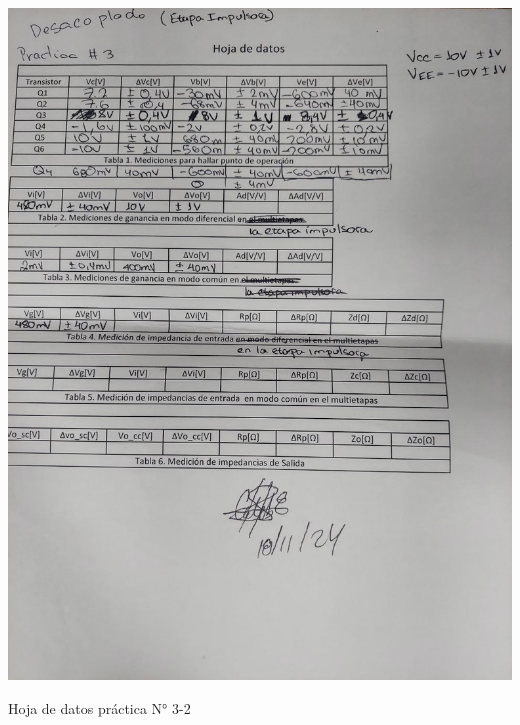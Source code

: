 \begin{ilustracion}[ht]
    \centering
    \includegraphics[width=1.0\textwidth]{src/images/p3/p3-hoja-de-datos-2.jpg}
    \caption{Hoja de datos práctica N° 3-2}
    \label{ilus:hoja-de-datos-p3-2}
\end{ilustracion}

